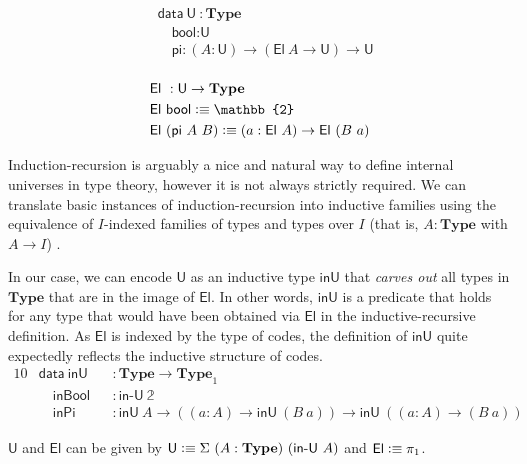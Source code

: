 \documentclass[autoref]{llncs}
\newcommand{\inU}{\mathsf{inU}}
\newcommand{\mType}{\mathbf{Type}}
\newcommand{\U}{\textsf{U}}
\newcommand{\El}{\textsf{El}}
\providecommand\mathbbm{\mathbb}
\newcommand{\defeq}{\mathrel{\vcentcolon\equiv}}
\begin{document}
{\small\vspace{-0.5em}
\begin{minipage}{0.45\textwidth}
\begin{align*}
  & \textsf{data}\ \U\ : \mType \\
  & \quad \textsf{bool} : \U \\
  & \quad \textsf{pi} : (A : \U) \to (\El\ A \to \U) \to \U \\
\end{align*}
\end{minipage}
\begin{minipage}{0.45\textwidth}
\begin{align*}
  & \El\ : \U \to \mType \\
  & \El\ \textsf{bool} \defeq \mathbbm{2} \\
  & \El\ (\textsf{pi}\ A\ B) \defeq (a : \El\ A) \to \El\ (B\ a) \\
\end{align*}
\end{minipage}}\vspace{-1em}

Induction-recursion is arguably a nice and natural way to define internal
universes in type theory, however it is not always strictly required.
%
We can translate basic instances of induction-recursion into inductive families
using the equivalence of $I$-indexed families of types and types over $I$
(that is, $A : \mType$ with $A \to I$) \cite{malatasta13smallir}.

In our case, we can encode $\U$ as an inductive type $\inU$ that
\emph{carves out} all types in $\mType$ that are in the image of $\El$. In other
words, $\inU$ is a predicate that holds for any type that would have been
obtained via $\El$ in the inductive-recursive definition. As $\El$ is indexed by
the type of codes, the definition of $\inU$ quite expectedly reflects the
inductive structure of codes.
{\small
\begin{alignat*}{10}
  & \textsf{data}\ \inU && : \mType \to \mType_1 \\
  & \quad \textsf{inBool} && : \textsf{in-U}\ \mathbbm{2} \\
  & \quad \textsf{inPi} && :  \inU\ A \to ((a : A) \to \inU\ (B\ a)) \to \inU\ ((a : A) \to (B\ a))
\end{alignat*}}\vspace{-1em}

$\U$ and $\El$ can be given by $\U \defeq \Sigma\ (A : \mType)\ (\textsf{in-U}\ A)$ and $\El \defeq \pi_1$.
\end{document}
